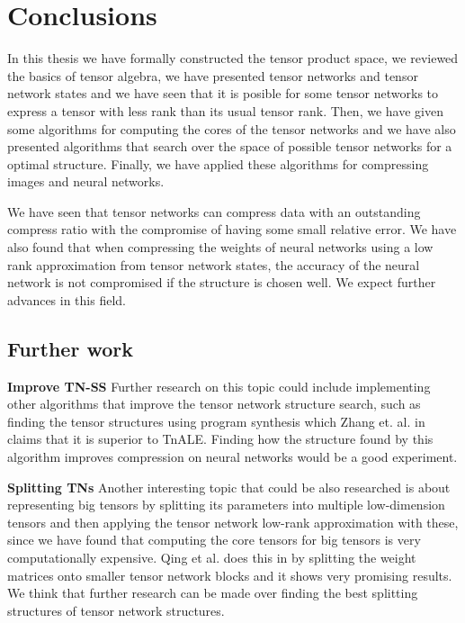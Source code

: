 \documentclass[11pt,a4paper,openright,oneside]{book}
\numberwithin{equation}{section}
\begin{document}
{\chapter{Conclusions}

In this thesis we have formally constructed the tensor product space, we reviewed
the basics of tensor algebra, we have presented tensor networks and tensor network states and we have seen
that it is posible for some tensor networks to express a tensor with less rank than its usual tensor rank.
Then, we have given some algorithms for computing the cores of the tensor networks and we have also presented
algorithms that search over the space of possible tensor networks for a optimal structure. Finally, we have
applied these algorithms for compressing images and neural networks.

We have seen that tensor networks can compress data with an outstanding compress ratio with the compromise
of having some small relative error. We have also found that when compressing the weights of neural networks using a low rank approximation from
tensor network states, the accuracy of the neural network is not compromised if the structure is chosen well. 
We expect further advances in this field.

\section*{Further work}

\textbf{Improve TN-SS} Further research on this topic could include implementing other algorithms that improve
the tensor network structure search, such as finding the tensor structures using program synthesis which
Zhang et. al. in \cite{guoTensorNetworkStructure2025} claims that it is superior to \gls{TnALE}. Finding how the structure
found by this algorithm improves compression on neural networks would be a good experiment.

\textbf{Splitting TNs} Another interesting topic that could be also researched is about representing big tensors by splitting its parameters
into multiple low-dimension tensors and then applying the tensor network low-rank approximation with these, since
we have found that computing the core tensors for big tensors is very computationally expensive. Qing et al.
does this in \cite{qingCompressingNeuralNetworks2025} by splitting the weight matrices onto smaller tensor network blocks
and it shows very promising results.
We think that further research can be made over finding the best splitting structures of
tensor network structures.

}
\end{document}
